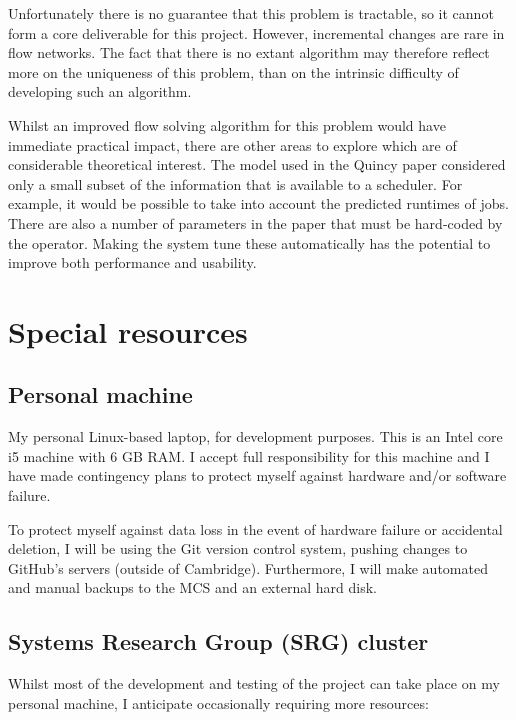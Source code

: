Unfortunately there is no guarantee that this problem is tractable, so it cannot form a core deliverable for this project. However, incremental changes are rare in flow networks. The fact that there is no extant algorithm may therefore reflect more on the uniqueness of this problem, than on the intrinsic difficulty of developing such an algorithm.

Whilst an improved flow solving algorithm for this problem would have immediate practical impact, there are other areas to explore which are of considerable theoretical interest. The model used in the Quincy paper considered only a small subset of the information that is available to a scheduler. For example, it would be possible to take into account the predicted runtimes of jobs. There are also a number of parameters in the paper that must be hard-coded by the operator. Making the system tune these automatically has the potential to improve both performance and usability. 

\section*{Special resources}
\label{sec:special-resources}

\subsection*{Personal machine}
My personal Linux-based laptop, for development purposes. This is an Intel core i5 machine with 6 GB RAM. I accept full responsibility for this machine and I have made contingency plans to protect myself against hardware and/or software failure.

To protect myself against data loss in the event of hardware failure or accidental deletion, I will be using the Git version control system, pushing changes to GitHub's servers (outside of Cambridge). Furthermore, I will make automated and manual backups to the MCS and an external hard disk.

\subsection*{Systems Research Group (SRG) cluster}
Whilst most of the development and testing of the project can take place on my personal machine, I anticipate occasionally requiring more resources:

